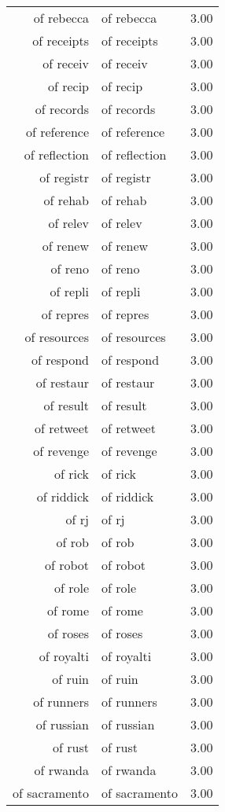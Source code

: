 \begin{table}[ht]
\begin{tabular}{rlr}
  of rebecca & of rebecca & 3.00 \\ 
  of receipts & of receipts & 3.00 \\ 
  of receiv & of receiv & 3.00 \\ 
  of recip & of recip & 3.00 \\ 
  of records & of records & 3.00 \\ 
  of reference & of reference & 3.00 \\ 
  of reflection & of reflection & 3.00 \\ 
  of registr & of registr & 3.00 \\ 
  of rehab & of rehab & 3.00 \\ 
  of relev & of relev & 3.00 \\ 
  of renew & of renew & 3.00 \\ 
  of reno & of reno & 3.00 \\ 
  of repli & of repli & 3.00 \\ 
  of repres & of repres & 3.00 \\ 
  of resources & of resources & 3.00 \\ 
  of respond & of respond & 3.00 \\ 
  of restaur & of restaur & 3.00 \\ 
  of result & of result & 3.00 \\ 
  of retweet & of retweet & 3.00 \\ 
  of revenge & of revenge & 3.00 \\ 
  of rick & of rick & 3.00 \\ 
  of riddick & of riddick & 3.00 \\ 
  of rj & of rj & 3.00 \\ 
  of rob & of rob & 3.00 \\ 
  of robot & of robot & 3.00 \\ 
  of role & of role & 3.00 \\ 
  of rome & of rome & 3.00 \\ 
  of roses & of roses & 3.00 \\ 
  of royalti & of royalti & 3.00 \\ 
  of ruin & of ruin & 3.00 \\ 
  of runners & of runners & 3.00 \\ 
  of russian & of russian & 3.00 \\ 
  of rust & of rust & 3.00 \\ 
  of rwanda & of rwanda & 3.00 \\ 
  of sacramento & of sacramento & 3.00 \\ 

\end{tabular}
\end{table}
